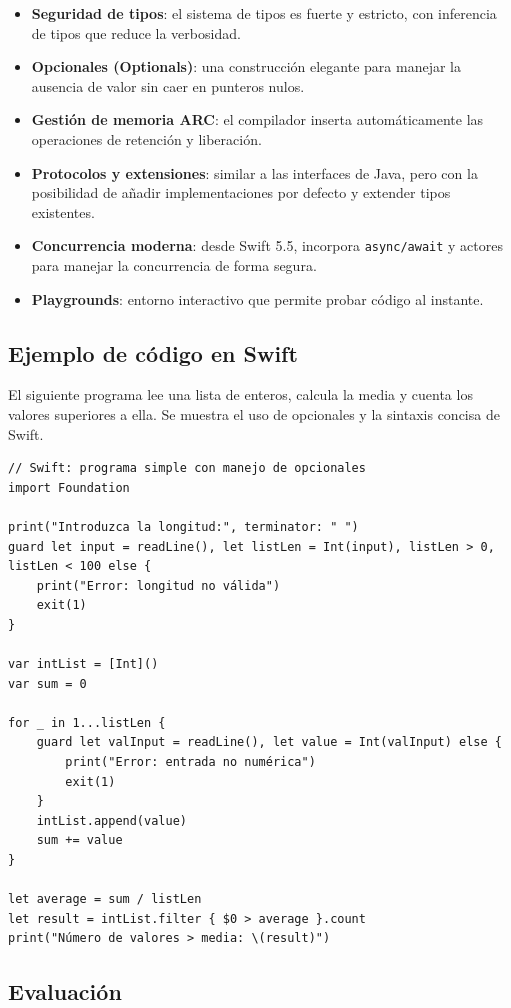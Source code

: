 \begin{itemize}
  \item \textbf{Seguridad de tipos}: el sistema de tipos es fuerte y estricto, con inferencia de tipos que reduce la verbosidad.
  \item \textbf{Opcionales (Optionals)}: una construcción elegante para manejar la ausencia de valor sin caer en punteros nulos.
  \item \textbf{Gestión de memoria ARC}: el compilador inserta automáticamente las operaciones de retención y liberación.
  \item \textbf{Protocolos y extensiones}: similar a las interfaces de Java, pero con la posibilidad de añadir implementaciones por defecto y extender tipos existentes.
  \item \textbf{Concurrencia moderna}: desde Swift 5.5, incorpora \texttt{async/await} y actores para manejar la concurrencia de forma segura.
  \item \textbf{Playgrounds}: entorno interactivo que permite probar código al instante.
\end{itemize}

\subsection{Ejemplo de código en Swift}

El siguiente programa lee una lista de enteros, calcula la media y cuenta los valores superiores a ella. Se muestra el uso de opcionales y la sintaxis concisa de Swift.

\begin{verbatim}
// Swift: programa simple con manejo de opcionales
import Foundation

print("Introduzca la longitud:", terminator: " ")
guard let input = readLine(), let listLen = Int(input), listLen > 0, listLen < 100 else {
    print("Error: longitud no válida")
    exit(1)
}

var intList = [Int]()
var sum = 0

for _ in 1...listLen {
    guard let valInput = readLine(), let value = Int(valInput) else {
        print("Error: entrada no numérica")
        exit(1)
    }
    intList.append(value)
    sum += value
}

let average = sum / listLen
let result = intList.filter { $0 > average }.count
print("Número de valores > media: \(result)")
\end{verbatim}

\subsection{Evaluación}

